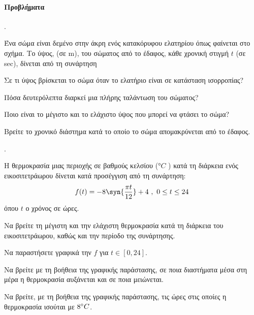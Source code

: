 \documentclass[11pt,a4paper,twocolumn]{article}
\newcounter{askhsh}
\newcommand{\askhsh}{\large\theaskhsh.\ \addtocounter{askhsh}{1}}
\newcommand{\eng}[1]{\selectlanguage{english}#1\selectlanguage{greek}}
\begin{document}
\paragraph{Προβλήματα}
\askhsh Ένα σώμα είναι δεμένο στην άκρη ενός κατακόρυφου ελατηρίου όπως φαίνεται στο σχήμα. Το ύψος, (σε \eng{m}), του σώματος από το έδαφος, κάθε χρονική στιγμή $t$ (σε \eng{sec}), δίνεται από τη συνάρτηση
\begin{center}
\end{center}
\begin{alist}
\item Σε τι ύψος βρίσκεται το σώμα όταν το ελατήριο είναι σε κατάσταση ισορροπίας?
\item Πόσα δευτερόλεπτα διαρκεί μια πλήρης ταλάντωση του σώματος?
\item Ποιο είναι το μέγιστο και το ελάχιστο ύψος που μπορεί να φτάσει το σώμα?
\item Βρείτε το χρονικό διάστημα κατά το οποίο το σώμα απομακρύνεται από το έδαφος.
\end{alist}
\askhsh Η θερμοκρασία μιας περιοχής σε βαθμούς κελσίου (°$C$ ) κατά τη διάρκεια ενός εικοσιτετράωρου δίνεται κατά προσέγγιση από τη συνάρτηση:
\[ f(t)=-8\syn{\frac{\pi t}{12}}+4\ ,\ 0\leq t\leq 24 \]
όπου $t$ ο χρόνος σε ώρες.
\begin{alist}
\item Να βρείτε τη μέγιστη και την ελάχιστη θερμοκρασία κατά τη διάρκεια του εικοσιτετράωρου, καθώς και την περίοδο της συνάρτησης.
\item Να παραστήσετε γραφικά την $f$ για $t\in[0,24]$.
\item Να βρείτε με τη βοήθεια της γραφικής παράστασης, σε ποια διαστήματα μέσα στη μέρα η θερμοκρασία αυξάνεται και σε ποια μειώνεται.
\item Να βρείτε, με τη βοήθεια της γραφικής παράστασης, τις ώρες στις οποίες η θερμοκρασία ισούται με $ 8\degree C $.
\end{alist}
\end{document}

